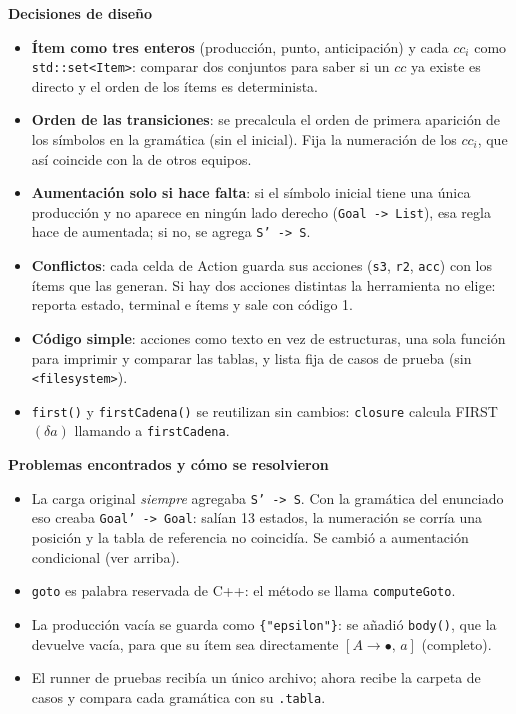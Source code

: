 \documentclass[10pt,a4paper]{article}
\begin{document}
\medskip
\textbf{Decisiones de diseño}
\begin{itemize}[nosep,leftmargin=*]
\item \textbf{Ítem como tres enteros} (producción, punto, anticipación) y cada
      $cc_i$ como \texttt{std::set<Item>}: comparar dos conjuntos para saber si
      un $cc$ ya existe es directo y el orden de los ítems es determinista.
\item \textbf{Orden de las transiciones}: se precalcula el orden de primera
      aparición de los símbolos en la gramática (sin el inicial). Fija la
      numeración de los $cc_i$, que así coincide con la de otros equipos.
\item \textbf{Aumentación solo si hace falta}: si el símbolo inicial tiene una
      única producción y no aparece en ningún lado derecho (\texttt{Goal -> List}),
      esa regla hace de aumentada; si no, se agrega \texttt{S' -> S}.
\item \textbf{Conflictos}: cada celda de Action guarda sus acciones
      (\texttt{s3}, \texttt{r2}, \texttt{acc}) con los ítems que las generan.
      Si hay dos acciones distintas la herramienta no elige: reporta estado,
      terminal e ítems y sale con código 1.
\item \textbf{Código simple}: acciones como texto en vez de estructuras, una
      sola función para imprimir y comparar las tablas, y lista fija de casos
      de prueba (sin \texttt{<filesystem>}).
\item \texttt{first()} y \texttt{firstCadena()} se reutilizan sin cambios:
      \texttt{closure} calcula FIRST$(\delta a)$ llamando a \texttt{firstCadena}.
\end{itemize}

\medskip
\textbf{Problemas encontrados y cómo se resolvieron}
\begin{itemize}[nosep,leftmargin=*]
\item La carga original \emph{siempre} agregaba \texttt{S' -> S}. Con la
      gramática del enunciado eso creaba \texttt{Goal' -> Goal}: salían 13
      estados, la numeración se corría una posición y la tabla de referencia no
      coincidía. Se cambió a aumentación condicional (ver arriba).
\item \texttt{goto} es palabra reservada de C++: el método se llama
      \texttt{computeGoto}.
\item La producción vacía se guarda como \texttt{\{"epsilon"\}}: se añadió
      \texttt{body()}, que la devuelve vacía, para que su ítem sea directamente
      $[A \to \bullet,\, a]$ (completo).
\item El runner de pruebas recibía un único archivo; ahora recibe la carpeta
      de casos y compara cada gramática con su \texttt{.tabla}.
\end{itemize}
\end{document}
